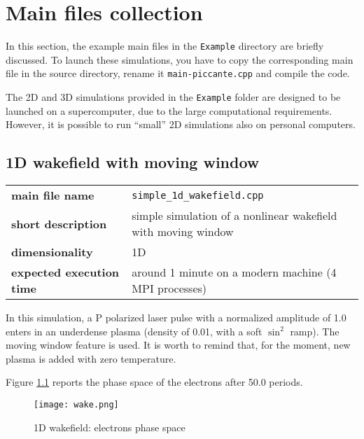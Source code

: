 \documentclass[11pt,a4paper]{report}
\begin{document}
\chapter{Main files collection}
In this section, the example main files in the \verb+Example+ directory are briefly discussed. To launch these simulations, you have to copy the corresponding main file in the source directory, rename it \verb+main-piccante.cpp+ and compile the code.

The 2D and 3D simulations provided in the \verb+Example+ folder are designed to be launched on a supercomputer, due to the large computational requirements. However, it is possible to run ``small'' 2D simulations also on personal computers. 

\section{1D wakefield with moving window}
\begin{center}
    \begin{tabular}{ l | l }
    	\textbf{main file name}           & \verb+simple_1d_wakefield.cpp+                                  \\
    	\textbf{short description}        & simple simulation of a nonlinear wakefield with moving window   \\
    	\textbf{dimensionality}           & 1D                                                              \\
    	\textbf{expected execution time}  & around 1 minute on a modern machine (4 MPI processes)
    \end{tabular}
\end{center}
In this simulation, a P polarized laser pulse with a normalized amplitude of 1.0 enters in an underdense plasma (density of 0.01, with a soft $\sin^2$ ramp). The moving window feature is used. It is worth to remind that, for the moment, new plasma is added with zero temperature.

Figure \ref{pic_1dwake} reports the phase space of the electrons after 50.0 periods.
    
    \begin{figure}[htbp]
    \centering
    \texttt{[image: wake.png]}
    \caption{1D wakefield: electrons phase space}
	\label{pic_1dwake}    
    \end{figure}    
\end{document}

